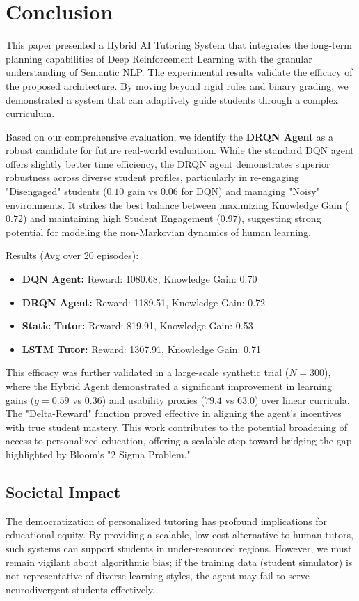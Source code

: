 \documentclass[conference]{IEEEtran}
\begin{document}
\section{Conclusion}
This paper presented a Hybrid AI Tutoring System that integrates the long-term planning capabilities of Deep Reinforcement Learning with the granular understanding of Semantic NLP. The experimental results validate the efficacy of the proposed architecture. By moving beyond rigid rules and binary grading, we demonstrated a system that can adaptively guide students through a complex curriculum.

Based on our comprehensive evaluation, we identify the \textbf{DRQN Agent} as a robust candidate for future real-world evaluation. While the standard DQN agent offers slightly better time efficiency, the DRQN agent demonstrates superior robustness across diverse student profiles, particularly in re-engaging "Disengaged" students ($0.10$ gain vs $0.06$ for DQN) and managing "Noisy" environments. It strikes the best balance between maximizing Knowledge Gain ($0.72$) and maintaining high Student Engagement ($0.97$), suggesting strong potential for modeling the non-Markovian dynamics of human learning.

Results (Avg over 20 episodes):
\begin{itemize}
    \item \textbf{DQN Agent:} Reward: 1080.68, Knowledge Gain: 0.70
    \item \textbf{DRQN Agent:} Reward: 1189.51, Knowledge Gain: 0.72
    \item \textbf{Static Tutor:} Reward: 819.91, Knowledge Gain: 0.53
    \item \textbf{LSTM Tutor:} Reward: 1307.91, Knowledge Gain: 0.71
\end{itemize} This efficacy was further validated in a large-scale synthetic trial ($N=300$), where the Hybrid Agent demonstrated a significant improvement in learning gains ($g=0.59$ vs $0.36$) and usability proxies ($79.4$ vs $63.0$) over linear curricula. The "Delta-Reward" function proved effective in aligning the agent's incentives with true student mastery. This work contributes to the potential broadening of access to personalized education, offering a scalable step toward bridging the gap highlighted by Bloom's "2 Sigma Problem."

\subsection*{Societal Impact}
The democratization of personalized tutoring has profound implications for educational equity. By providing a scalable, low-cost alternative to human tutors, such systems can support students in under-resourced regions. However, we must remain vigilant about algorithmic bias; if the training data (student simulator) is not representative of diverse learning styles, the agent may fail to serve neurodivergent students effectively.
\end{document}
